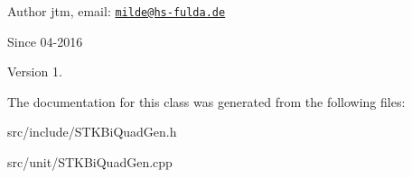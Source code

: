 \begin{DoxyAuthor}{Author}
jtm, email\-:  \href{mailto:milde@hs-fulda.de}{\tt milde@hs-\/fulda.\-de} 
\end{DoxyAuthor}
\begin{DoxySince}{Since}
04-\/2016 
\end{DoxySince}
\begin{DoxyVersion}{Version}
1. 
\end{DoxyVersion}


The documentation for this class was generated from the following files\-:\begin{DoxyCompactItemize}
\item 
src/include/S\-T\-K\-Bi\-Quad\-Gen.\-h\item 
src/unit/S\-T\-K\-Bi\-Quad\-Gen.\-cpp\end{DoxyCompactItemize}
